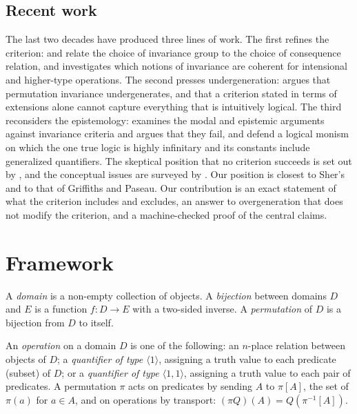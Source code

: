 \documentclass{situationist-preprint}
\begin{document}
\subsection{Recent work}

The last two decades have produced three lines of work. The first refines the criterion: \citet{Bonnay2008} and \citet{BonnayWesterstahl2012} relate the choice of invariance group to the choice of consequence relation, and \citet{Woods2016} investigates which notions of invariance are coherent for intensional and higher-type operations. The second presses undergeneration: \citet{DutilhNovaes2014} argues that permutation invariance undergenerates, and that a criterion stated in terms of extensions alone cannot capture everything that is intuitively logical. The third reconsiders the epistemology: \citet{Sagi2015} examines the modal and epistemic arguments against invariance criteria and argues that they fail, and \citet{GriffithsPaseau2022} defend a logical monism on which the one true logic is highly infinitary and its constants include generalized quantifiers. The skeptical position that no criterion succeeds is set out by \citet{GomezTorrente2002}, and the conceptual issues are surveyed by \citet{MacFarlane2000}. Our position is closest to Sher's and to that of Griffiths and Paseau. Our contribution is an exact statement of what the criterion includes and excludes, an answer to overgeneration that does not modify the criterion, and a machine-checked proof of the central claims.

\section{Framework}\label{s:frame}

\begin{definition}\label{d:perm}
A \emph{domain} is a non-empty collection of objects. A \emph{bijection} between domains $D$ and $E$ is a function $f\colon D \to E$ with a two-sided inverse. A \emph{permutation} of $D$ is a bijection from $D$ to itself.
\end{definition}

\begin{definition}\label{d:ops}
An \emph{operation} on a domain $D$ is one of the following: an $n$-place relation between objects of $D$; a \emph{quantifier of type $\langle 1\rangle$}, assigning a truth value to each predicate (subset) of $D$; or a \emph{quantifier of type $\langle 1, 1\rangle$}, assigning a truth value to each pair of predicates. A permutation $\pi$ acts on predicates by sending $A$ to $\pi[A]$, the set of $\pi(a)$ for $a \in A$, and on operations by transport: $(\pi Q)(A) = Q(\pi^{-1}[A])$.
\end{definition}
\end{document}
